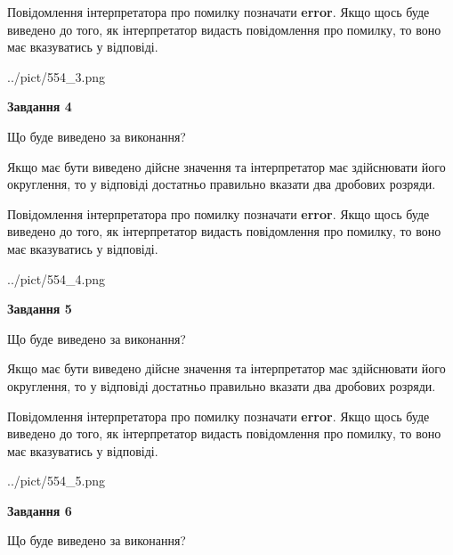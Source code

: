 \documentclass[12pt, ukrainian]{article}
\begin{document}
{\begin {Large}
Повідомлення інтерпретатора про помилку позначати \textbf{error}.
Якщо щось буде виведено до того, як інтерпретатор видасть повідомлення про помилку, 
то воно має вказуватись у відповіді. \par

\begin{center}
	{../pict/554_3.png}
\end{center}
\newpage

{\begin {center}\textbf{Завдання 4}\end {center}}\par
Що буде виведено за виконання? \par

Якщо має бути виведено дійсне значення та інтерпретатор має здійснювати його округлення, 
то у відповіді достатньо правильно вказати два дробових розряди.

Повідомлення інтерпретатора про помилку позначати \textbf{error}.
Якщо щось буде виведено до того, як інтерпретатор видасть повідомлення про помилку, 
то воно має вказуватись у відповіді. \par

\begin{center}
	{../pict/554_4.png}
\end{center}
\newpage

{\begin {center}\textbf{Завдання 5}\end {center}}\par
Що буде виведено за виконання? \par

Якщо має бути виведено дійсне значення та інтерпретатор має здійснювати його округлення, 
то у відповіді достатньо правильно вказати два дробових розряди.

Повідомлення інтерпретатора про помилку позначати \textbf{error}.
Якщо щось буде виведено до того, як інтерпретатор видасть повідомлення про помилку, 
то воно має вказуватись у відповіді. \par

\begin{center}
	{../pict/554_5.png}
\end{center}
\newpage

{\begin {center}\textbf{Завдання 6}\end {center}}\par
Що буде виведено за виконання? \par


\end{Large}}
\end{document}
